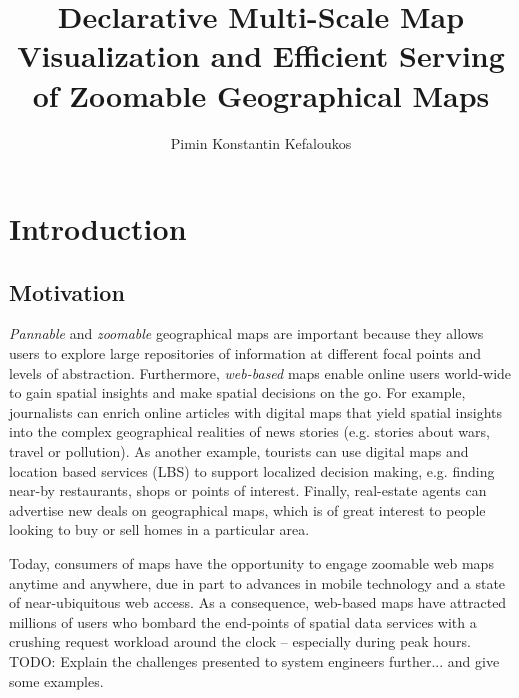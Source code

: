 \documentclass[11pt, oneside]{report}   	%
\title{Declarative Multi-Scale Map Visualization and Efficient Serving of Zoomable Geographical Maps}
\author{Pimin Konstantin Kefaloukos}
\begin{document}
\maketitle

\tableofcontents

\chapter{Introduction}


\section{Motivation}
\emph{Pannable} and \emph{zoomable} geographical maps are important because they allows users to explore large repositories of information at different focal points and levels of abstraction. Furthermore, \emph{web-based} maps enable online users world-wide to gain spatial insights and make spatial decisions on the go. For example, journalists can enrich online articles with digital maps that yield spatial insights into the complex geographical realities of news stories (e.g. stories about wars, travel or pollution). As another example, tourists can use digital maps and location based services (LBS) to support localized decision making, e.g. finding near-by restaurants, shops or points of interest. Finally, real-estate agents can advertise new deals on geographical maps, which is of great interest to people looking to buy or sell homes in a particular area. %

Today, consumers of maps have the opportunity to engage zoomable web maps anytime and anywhere, due in part to advances in mobile technology and a state of near-ubiquitous web access. As a consequence, web-based maps have attracted millions of users who bombard the end-points of spatial data services with a crushing request workload around the clock -- especially during peak hours. TODO: Explain the challenges presented to system engineers further... and give some examples.
\end{document}

